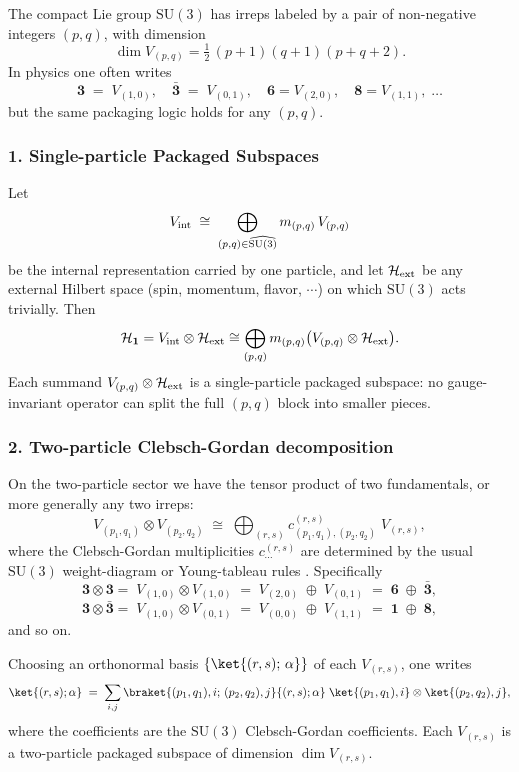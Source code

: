 \documentclass[12pt,a4paper]{article}
\begin{document}
The compact Lie group $\mathrm{SU}(3)$ has irreps labeled by a pair of non-negative integers $(p,q)$, with dimension
$$
\dim V_{(p,q)} = \tfrac12\,(p+1)(q+1)(p+q+2).
$$
In physics one often writes
\[
\mathbf{3}\;=\;V_{(1,0)},\quad
\bar{\mathbf{3}}\;=\;V_{(0,1)},\quad
\mathbf{6}=V_{(2,0)},\quad
\mathbf{8}=V_{(1,1)},\;\dots
\]
but the same packaging logic holds for any $(p,q)$.



\subsubsection*{1. Single-particle Packaged Subspaces}

Let
\[
V_{\rm int}
\;\cong\;
\bigoplus_{(p,q)\in\widehat{\mathrm{SU}(3)}} m_{(p,q)}\,V_{(p,q)}
\]
be the internal representation carried by one particle, and let $\mathcal H_{\rm ext}$ be any external Hilbert space (spin, momentum, flavor, $\cdots$) on which $\mathrm{SU}(3)$ acts trivially.
Then
\[
\mathcal H_{\mathbf 1}
=
V_{\rm int} \otimes \mathcal H_{\rm ext}
\cong
\bigoplus_{(p,q)} m_{(p,q)} \bigl(V_{(p,q)}\otimes\mathcal H_{\rm ext}\bigr).
\]
Each summand $V_{(p,q)}\otimes\mathcal H_{\rm ext}$ is a single-particle packaged subspace:
no gauge-invariant operator can split the full $(p,q)$ block into smaller pieces.



\subsubsection*{2. Two-particle Clebsch-Gordan decomposition \cite{Racah1942,Wigner1959}}

On the two-particle sector we have the tensor product of two fundamentals, or more generally any two irreps:
\[
V_{(p_1,q_1)}\otimes V_{(p_2,q_2)}
\;\cong\;
\bigoplus_{(r,s)} c^{(r,s)}_{(p_1,q_1),(p_2,q_2)}\;V_{(r,s)},
\]
where the Clebsch-Gordan multiplicities $c^{(r,s)}_{\cdots}$ are determined by the usual $\mathrm{SU}(3)$ weight-diagram or Young-tableau rules \cite{Georgi2000,Gross1973,GellMann1961}.
Specifically
\[
\mathbf{3}\otimes\mathbf{3}
=\;V_{(1,0)}\!\otimes V_{(1,0)}
\;=\;
V_{(2,0)}\;\oplus\;V_{(0,1)}
\;=\;
\mathbf{6}\;\oplus\;\bar{\mathbf3},
\]
\[
\mathbf{3}\otimes\bar{\mathbf{3}}
=\;
V_{(1,0)}\!\otimes V_{(0,1)}
\;=\;
V_{(0,0)}\;\oplus\;V_{(1,1)}
\;=\;
\mathbf{1}\;\oplus\;\mathbf{8},
\]
and so on.

Choosing an orthonormal basis $\{\ket{(r,s);\,\alpha}\}$ of each $V_{(r,s)}$, one writes
\[
\ket{(r,s);\alpha}
\;=\;
\sum_{i,j}
\braket{(p_1,q_1),i;\,(p_2,q_2),j}{(r,s);\alpha}
\;\ket{(p_1,q_1),i}\otimes\ket{(p_2,q_2),j},
\]
where the coefficients are the $\mathrm{SU}(3)$ Clebsch-Gordan coefficients.
Each $V_{(r,s)}$ is a two-particle packaged subspace of dimension $\dim V_{(r,s)}$.
\end{document}
